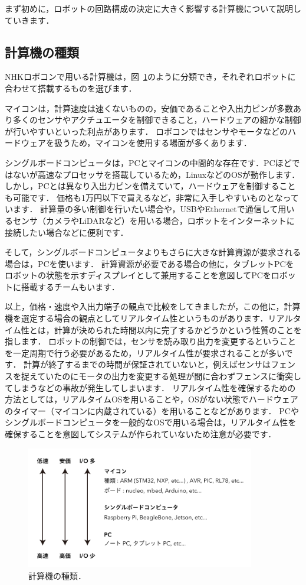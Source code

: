 まず初めに，ロボットの回路構成の決定に大きく影響する計算機について説明していきます．

\subsection{計算機の種類}

NHKロボコンで用いる計算機は，図~\ref{fig:computers}のように分類でき，それぞれロボットに合わせて搭載するものを選びます．

マイコンは，計算速度は速くないものの，安価であることや入出力ピンが多数あり多くのセンサやアクチュエータを制御できること，ハードウェアの細かな制御が行いやすいといった利点があります．
ロボコンではセンサやモータなどのハードウェアを扱うため，マイコンを使用する場面が多くあります．

シングルボードコンピュータは，PCとマイコンの中間的な存在です．PCほどではないが高速なプロセッサを搭載しているため，LinuxなどのOSが動作します．
しかし，PCとは異なり入出力ピンを備えていて，ハードウェアを制御することも可能です．
価格も1万円以下で買えるなど，非常に入手しやすいものとなっています．
計算量の多い制御を行いたい場合や，USBやEthernetで通信して用いるセンサ（カメラやLiDARなど）を用いる場合，ロボットをインターネットに接続したい場合などに便利です．

そして，シングルボードコンピュータよりもさらに大きな計算資源が要求される場合は，PCを使います．
計算資源が必要である場合の他に，タブレットPCをロボットの状態を示すディスプレイとして兼用することを意図してPCをロボットに搭載するチームもいます．

以上，価格・速度や入出力端子の観点で比較をしてきましたが，この他に，計算機を選定する場合の観点としてリアルタイム性というものがあります．リアルタイム性とは，計算が決められた時間以内に完了するかどうかという性質のことを指します．
ロボットの制御では，センサを読み取り出力を変更するということを一定周期で行う必要があるため，リアルタイム性が要求されることが多いです．
計算が終了するまでの時間が保証されていないと，例えばセンサはフェンスを捉えていたのにモータの出力を変更する処理が間に合わずフェンスに衝突してしまうなどの事故が発生してしまいます．
リアルタイム性を確保するための方法としては，リアルタイムOSを用いることや，OSがない状態でハードウェアのタイマー（マイコンに内蔵されている）を用いることなどがあります．
PCやシングルボードコンピュータを一般的なOSで用いる場合は，リアルタイム性を確保することを意図してシステムが作られていないため注意が必要です．

\begin{figure}[h]
  \centering
  \includegraphics[width=10cm]{circuit/fig/2_computers.pdf}
  \caption{計算機の種類．}
  \label{fig:computers}
\end{figure}


